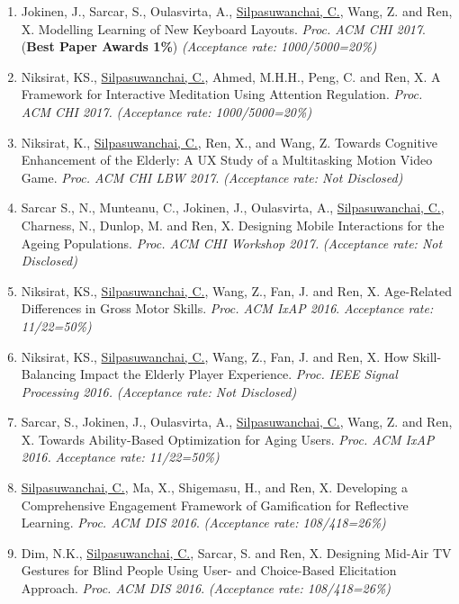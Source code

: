 \documentclass[letterpaper,11pt]{article}
\makeatletter
\newlength{\bibhang}
\newlength{\bibsep}
{\@listi \global\bibsep\itemsep \global\advance\bibsep by\parsep}
\newenvironment{bibsection}%
{\begin{enumerate}{}{%
			
			\setlength{\leftmargin}{\bibhang}%
			\setlength{\itemindent}{-\leftmargin}%
			\setlength{\itemsep}{\bibsep}%
			\setlength{\parsep}{\z@}%
			\setlength{\partopsep}{0pt}%
			\setlength{\topsep}{0pt}}}
	{\end{enumerate}}
\makeatother
\begin{document}
\begin{bibsection}
	Understanding the Role of Human Senses in Interactive Meditation. \textit{Proc. ACM CHI 2017}.   \textit{(Acceptance rate: 1000/5000=20\%)}
	\item Jokinen, J., Sarcar, S., Oulasvirta, A., \underline{Silpasuwanchai, C.}, Wang, Z. and Ren, X. Modelling Learning of New Keyboard Layouts. \textit{Proc. ACM CHI 2017}. (\textbf{Best Paper Awards 1\%})   \textit{(Acceptance rate: 1000/5000=20\%)}
	\item Niksirat, KS., \underline{Silpasuwanchai, C.}, Ahmed, M.H.H., Peng, C. and Ren, X. A Framework for Interactive Meditation Using Attention Regulation. \textit{Proc. ACM CHI 2017.}   \textit{(Acceptance rate: 1000/5000=20\%)}
	\item Niksirat, K., \underline{Silpasuwanchai, C.}, Ren, X., and Wang, Z. Towards Cognitive Enhancement of the Elderly: A UX Study of a Multitasking Motion Video Game. \textit{Proc. ACM CHI LBW 2017}.  \textit{(Acceptance rate: Not Disclosed)}
	\item Sarcar S., N., Munteanu, C., Jokinen, J., Oulasvirta, A., \underline{Silpasuwanchai, C.}, Charness,
	N., Dunlop, M. and Ren, X. Designing Mobile Interactions for the Ageing
	Populations. \textit{Proc. ACM CHI Workshop 2017.}  \textit{(Acceptance rate: Not Disclosed)}
	\item Niksirat, KS., \underline{Silpasuwanchai, C.}, Wang, Z., Fan, J. and Ren, X. Age-Related Differences in Gross Motor Skills. \textit{Proc. ACM IxAP 2016}.  \textit{Acceptance rate: 11/22=50\%)}
	\item Niksirat, KS., \underline{Silpasuwanchai, C.}, Wang, Z., Fan, J. and Ren, X. How Skill-Balancing Impact the Elderly Player Experience. \textit{Proc. IEEE Signal Processing 2016.} \textit{(Acceptance rate: Not Disclosed)}
	\item Sarcar, S., Jokinen, J., Oulasvirta, A., \underline{Silpasuwanchai, C.}, Wang, Z. and Ren, X. Towards Ability-Based Optimization for Aging Users. \textit{Proc. ACM IxAP 2016.} \textit{Acceptance rate: 11/22=50\%)}
	\item \underline{Silpasuwanchai, C.}, Ma, X., Shigemasu, H., and Ren, X. Developing a Comprehensive Engagement Framework of Gamification for Reflective Learning. \textit{Proc. ACM DIS 2016}.  \textit{(Acceptance rate: 108/418=26\%)}
	\item Dim, N.K., \underline{Silpasuwanchai, C.}, Sarcar, S. and Ren, X. Designing Mid-Air TV
	Gestures for Blind People Using User- and Choice-Based Elicitation Approach. \textit{Proc. ACM DIS 2016}.   \textit{(Acceptance rate: 108/418=26\%)}

\end{bibsection}
\end{document}

